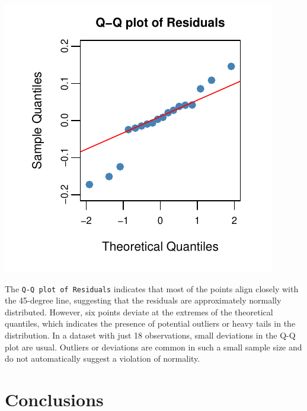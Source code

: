 \documentclass[
  11pt,
]{article}
\begin{document}
\includegraphics{Figs/unnamed-chunk-21-1.pdf}

The \texttt{Q-Q\ plot\ of\ Residuals} indicates that most of the points
align closely with the 45-degree line, suggesting that the residuals are
approximately normally distributed. However, six points deviate at the
extremes of the theoretical quantiles, which indicates the presence of
potential outliers or heavy tails in the distribution. In a dataset with
just 18 observations, small deviations in the Q-Q plot are usual.
Outliers or deviations are common in such a small sample size and do not
automatically suggest a violation of normality.

\section{Conclusions}\label{conclusions}
\end{document}
